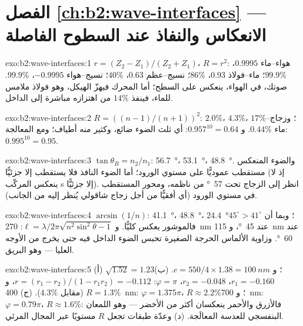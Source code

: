 \section*{الفصل \ref{ch:b2:wave-interfaces} --- الانعكاس والنفاذ عند السطوح الفاصلة}

\begin{solution}{exo:b2:wave-interfaces:1}
$r = (Z_2 - Z_1)/(Z_2 + Z_1)$، $R = r^2$: هواء--ماء $0.9995$، $99.9\%$؛
ماء--فولاذ $0.93$، $86\%$؛ نسيج--عظم $0.63$، $40\%$؛ نسيج--هواء
$-0.9995$، $99.9\%$. صوتك، في الهواء، ينعكس على السطح؛ أما المحرك
فيهزّ الهيكل، وهو فولاذ ملامس للماء، فينفذ $14\%$ من اهتزازه
مباشرة إلى الداخل.
\end{solution}

\begin{solution}{exo:b2:wave-interfaces:2}
$R = ((n - 1)/(n + 1))^2$: $2.0\%$، $4.3\%$، $17\%$؛ وزجاج--ماء $0.44\%$.
و $0.957^{10} = 0.64$: أي ثلث الضوء ضائع، وكثير منه أطياف؛
ومع المعالجة: $0.995^{10} = 0.95$.
\end{solution}

\begin{solution}{exo:b2:wave-interfaces:3}
$\tan\theta_B = n_2/n_1$: \qty{56.7}{\degree}، \qty{53.1}{\degree}، \qty{48.8}{\degree}. والضوء
المنعكس مستقطب عموديًّا على مستوي الورود؛ أما الضوء النافذ فلا
يستقطب إلا جزئيًّا (إذ لا ينعكس المركّب s إلا جزئيًّا). انظر إلى
الزجاج تحت \qty{57}{\degree} من ناظمه، ومحور المستقطب في مستوي الورود
(أي أفقيًّا من أجل زجاج شاقولي يُنظر إليه من الجانب).
\end{solution}

\begin{solution}{exo:b2:wave-interfaces:4}
$\arcsin(1/n)$: \qty{41.1}{\degree}، \qty{48.8}{\degree}، \qty{24.4}{\degree}؛ وبما أن $45^\circ > 41^\circ$
فالموشور يعكس كليًّا. و $\ell = \lambda/2\pi\sqrt{n^2\sin^2\theta - 1}$: \qty{270}{nm}
عند \qty{45}{\degree}، و \qty{115}{nm} عند \qty{60}{\degree}. وزاوية الألماس الحرجة
الصغيرة تحبس الضوء الداخل فيه حتى يخرج من الأوجه العليا ---
وهو البريق.
\end{solution}

\begin{solution}{exo:b2:wave-interfaces:5}
(أ) $\sqrt{1.52} = 1.23$؛ و $e = 550/4 \times 1.38 = \qty{100}{nm}$. (ب) $r_1 = -0.160$، $r_2 =
-0.048$، $\varphi = \pi$: $r = (r_1 - r_2)/(1 - r_1r_2) = -0.112$، و $R = 1.3\%$ (مقابل
$4.3\%$). (ج) \qty{400}{nm}: $\varphi = 1.375\pi$، $R \approx 2.2\%$؛ و \qty{700}{nm}: $\varphi =
0.79\pi$، $R \approx 1.6\%$: فالأزرق والأحمر ينعكسان أكثر من الأخضر ---
وهو اللمعان البنفسجي للعدسة المعالَجة. (د) وعدّة طبقات تجعل $R$
مستويًا عبر المجال المرئي.
\end{solution}

